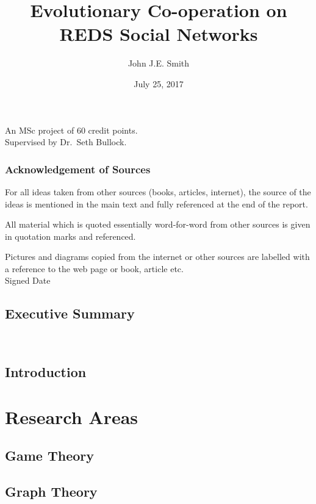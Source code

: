 \documentclass[a4paper, 12pt, notitlepage]{report}
\title{Evolutionary Co-operation on REDS Social Networks} %
\author{John J.E. Smith} %
\date{July 25, 2017} %
\numberwithin{equation}{subsection}
\theoremstyle{definition}
\theoremstyle{theorem}
\theoremstyle{definition}
\begin{document}
\maketitle
\begin{center}
An MSc project of 60 credit points. %
\\[12pt]
Supervised by Dr.\ Seth Bullock. %
\end{center}
\thispagestyle{empty}
\newpage
\section*{Acknowledgement of Sources} %
For all ideas taken from other sources (books, articles, internet), the source of the ideas is mentioned in the main text and fully referenced at the end of the report.

All material which is quoted essentially word-for-word from other sources is given in quotation marks and referenced.

Pictures and diagrams copied from the internet or other sources are labelled with a reference to the web page or book, article etc.
\\[12pt]
Signed \dotfill Date \dotfill

\tableofcontents 


\chapter*{Executive Summary}
%
\

\chapter*{Introduction}




\part{Research Areas}

\chapter{Game Theory}

\chapter{Graph Theory}
\end{document}
